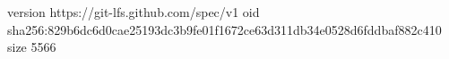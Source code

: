 version https://git-lfs.github.com/spec/v1
oid sha256:829b6dc6d0cae25193dc3b9fe01f1672ce63d311db34e0528d6fddbaf882c410
size 5566
